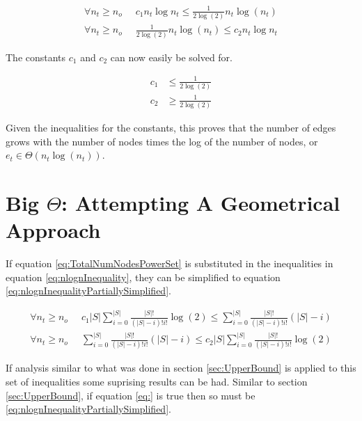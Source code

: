 \documentclass{article}
\begin{document}
\begin{equation}
    \begin{split}
        \forall n_t\ge n_o \;\; &
        c_1 n_t \log n_t \le \frac{1}{2\log(2)}n_t\log(n_t)
        \\
        \forall n_t\ge n_o \;\; &
        \frac{1}{2\log(2)}n_t\log(n_t) \le c_2 n_t \log n_t
    \end{split}
    \label{eq:nlognInequalitySimplified}
\end{equation}

The constants $c_1$ and $c_2$ can now easily be solved for.

\begin{equation}
    \begin{split}
        c_1 &\le \frac{1}{2\log(2)}
        \\
        c_2 &\ge \frac{1}{2\log(2)}
    \end{split}
    \label{eq:BoundardInequalities}
\end{equation}

Given the inequalities for the constants, this proves that the number of edges grows with the number of nodes times the log of the number of nodes, or $e_t\in \Theta(n_t\log(n_t))$.

\section{Big $\Theta$: Attempting A Geometrical Approach}
\label{sec:TigherBoundGeometricalApproach}

If equation \ref{eq:TotalNumNodesPowerSet} is substituted in the inequalities in equation \ref{eq:nlognInequality}, they can be simplified to equation \ref{eq:nlognInequalityPartiallySimplified}.

\begin{equation}
    \begin{split}
        \forall n_t\ge n_o \;\; &
        c_1|S|\sum_{i=0}^{|S|}\frac{|S|!}{(|S|-i)!i!}
        \log \left( 2 \right)
        \le
        \sum_{i=0}^{|S|}\frac{|S|!}{(|S|-i)!i!}(|S|-i)
        \\
        \forall n_t\ge n_o \;\; &
        \sum_{i=0}^{|S|}\frac{|S|!}{(|S|-i)!i!}(|S|-i)
        \le
        c_2|S|\sum_{i=0}^{|S|}\frac{|S|!}{(|S|-i)!i!}
        \log \left( 2 \right)
    \end{split}
    \label{eq:nlognInequalityPartiallySimplified}
\end{equation}

If analysis similar to what was done in section \ref{sec:UpperBound} is applied to this set of inequalities some suprising results can be had. Similar to section \ref{sec:UpperBound}, if equation \ref{eq:} is true then so must be \ref{eq:nlognInequalityPartiallySimplified}.
\end{document}
